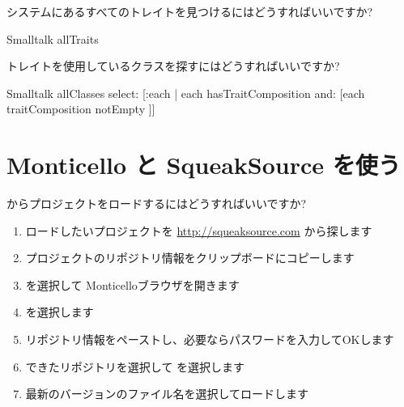 \documentclass[a4paper,10pt,twoside]{book}
\begin{document}
\begin{faq}
システムにあるすべてのトレイトを見つけるにはどうすればいいですか?
\end{faq}
\answer
\begin{code}{}
Smalltalk allTraits
\end{code}

\begin{faq}
トレイトを使用しているクラスを探すにはどうすればいいですか?
\end{faq}
\answer
\begin{code}{}
Smalltalk allClasses select: [:each | each hasTraitComposition and: [each traitComposition notEmpty ]]
\end{code}

\section{Monticello と SqueakSource を使う}

\begin{faq}
 からプロジェクトをロードするにはどうすればいいですか?
\end{faq}
\answer
\begin{enumerate}
  \item ロードしたいプロジェクトを \url{http://squeaksource.com} から探します
  \item プロジェクトのリポジトリ情報をクリップボードにコピーします
  \item {} を選択して Monticelloブラウザを開きます
  \item {} を選択します
  \item リポジトリ情報をペーストし、必要ならパスワードを入力してOKします
  \item できたリポジトリを選択して  を選択します
  \item 最新のバージョンのファイル名を選択してロードします
\end{enumerate}
\end{document}
